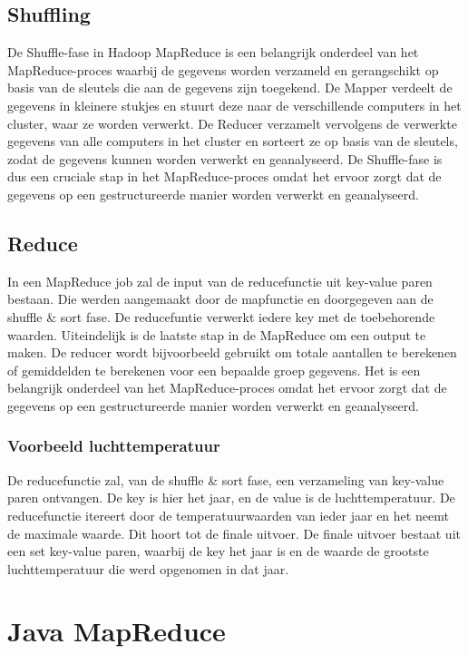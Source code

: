 \documentclass[a4paper,10pt,twoside]{report}
\begin{document}
\subsection{Shuffling}

De Shuffle-fase in Hadoop MapReduce is een belangrijk onderdeel van het MapReduce-proces waarbij de gegevens worden verzameld en gerangschikt op basis van de sleutels die aan de gegevens zijn toegekend. De Mapper verdeelt de gegevens in kleinere stukjes en stuurt deze naar de verschillende computers in het cluster, waar ze worden verwerkt. De Reducer verzamelt vervolgens de verwerkte gegevens van alle computers in het cluster en sorteert ze op basis van de sleutels, zodat de gegevens kunnen worden verwerkt en geanalyseerd. De Shuffle-fase is dus een cruciale stap in het MapReduce-proces omdat het ervoor zorgt dat de gegevens op een gestructureerde manier worden verwerkt en geanalyseerd.

\subsection{Reduce}

In een MapReduce job zal de input van de reducefunctie uit key-value paren bestaan. Die werden aangemaakt door de mapfunctie en doorgegeven aan de shuffle \& sort fase. De reducefuntie verwerkt iedere key met de toebehorende waarden. Uiteindelijk is de laatste stap in de MapReduce om een output te maken. De reducer wordt bijvoorbeeld gebruikt om totale aantallen te berekenen of gemiddelden te berekenen voor een bepaalde groep gegevens. Het is een belangrijk onderdeel van het MapReduce-proces omdat het ervoor zorgt dat de gegevens op een gestructureerde manier worden verwerkt en geanalyseerd.


\subsubsection{Voorbeeld luchttemperatuur}

De reducefunctie zal, van de shuffle \& sort fase, een verzameling van key-value paren ontvangen. De key is hier het jaar, en de value is de luchttemperatuur. De reducefunctie itereert door de temperatuurwaarden van ieder jaar en het neemt de maximale waarde. Dit hoort tot de finale uitvoer. De finale uitvoer bestaat uit een set key-value paren, waarbij de key het jaar is en de waarde de grootste luchttemperatuur die werd opgenomen in dat jaar.

\section{Java MapReduce}
\end{document}
